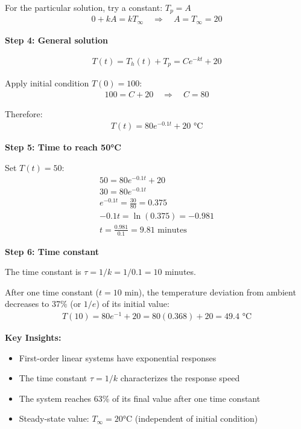 \documentclass[11pt,a4paper]{article}
\begin{document}
For the particular solution, try a constant: $T_p = A$
\begin{align}
  0 + kA = kT_{\infty} \quad \Rightarrow \quad A = T_{\infty} = 20
\end{align}

\textbf{Step 4: General solution}

\begin{align}
  T(t) = T_h(t) + T_p = Ce^{-kt} + 20
\end{align}

Apply initial condition $T(0) = 100$:
\begin{align}
  100 = C + 20 \quad \Rightarrow \quad C = 80
\end{align}

Therefore:
\begin{align}
  T(t) = 80e^{-0.1t} + 20 \text{ °C}
\end{align}

\textbf{Step 5: Time to reach 50°C}

Set $T(t) = 50$:
\begin{align}
  50 = 80e^{-0.1t} + 20 \\
  30 = 80e^{-0.1t} \\
  e^{-0.1t} = \frac{30}{80} = 0.375 \\
  -0.1t = \ln(0.375) = -0.981 \\
  t = \frac{0.981}{0.1} = 9.81 \text{ minutes}
\end{align}

\textbf{Step 6: Time constant}

The time constant is $\tau = 1/k = 1/0.1 = 10$ minutes.

After one time constant ($t = 10$ min), the temperature deviation from ambient decreases to 37\% (or $1/e$) of its initial value:
\begin{align}
  T(10) = 80e^{-1} + 20 = 80(0.368) + 20 = 49.4 \text{ °C}
\end{align}

\textbf{Key Insights:}
\begin{itemize}
  \item First-order linear systems have exponential responses
  \item The time constant $\tau = 1/k$ characterizes the response speed
  \item The system reaches 63\% of its final value after one time constant
  \item Steady-state value: $T_{\infty} = 20$°C (independent of initial condition)
\end{itemize}
\end{document}
